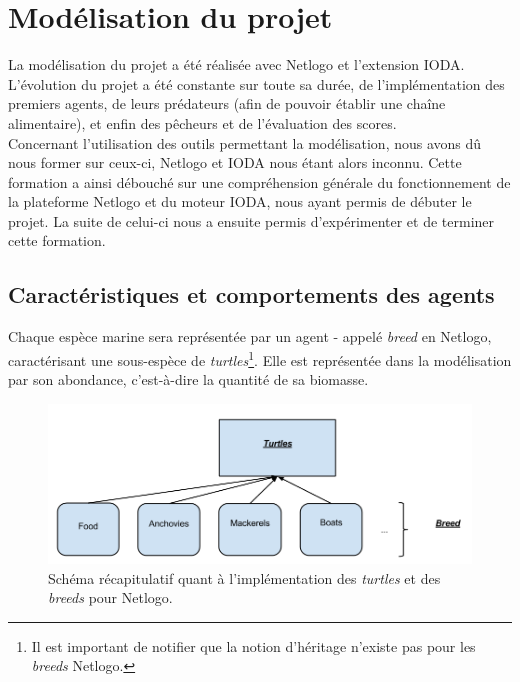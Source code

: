 \chapter{Modélisation du projet}

La modélisation du projet a été réalisée avec Netlogo et l'extension IODA.
\\
L'évolution du projet a été constante sur toute sa durée, de l'implémentation des premiers agents, de leurs prédateurs (afin de pouvoir établir une chaîne alimentaire), et enfin des pêcheurs et de l'évaluation des scores.
\\
Concernant l'utilisation des outils permettant la modélisation, nous avons dû nous former sur ceux-ci, Netlogo et IODA nous étant alors inconnu. Cette formation a ainsi débouché sur une compréhension générale du fonctionnement de la plateforme Netlogo et du moteur IODA, nous ayant permis de débuter le projet. La suite de celui-ci nous a ensuite permis d'expérimenter et de terminer cette formation.\nocite{largouet}

\section{Caractéristiques et comportements des agents}

Chaque espèce marine sera représentée par un agent - appelé \textit{breed} en Netlogo, caractérisant une sous-espèce de \textit{turtles}\footnote{Il est important de notifier que la notion d'héritage n'existe pas pour les \textit{breeds} Netlogo.}. Elle est représentée dans la modélisation par son abondance, c'est-à-dire la quantité de sa biomasse.
\\
\begin{figure}[h]
\begin{center}
\includegraphics[scale=0.43]{img/breed_exemple.png}
\end{center}
\caption{Schéma récapitulatif quant à l'implémentation des \textit{turtles} et des \textit{breeds} pour Netlogo.}
\label{fig:beed_exemple}
\end{figure}

